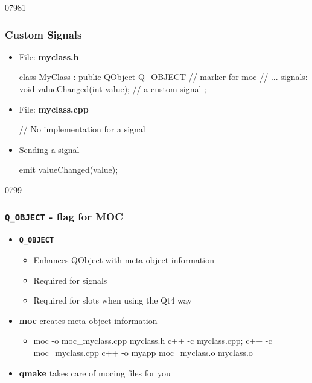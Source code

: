 
\begin{slide}[fragile]{07981}\frametitle{Custom Signals}
\label{codeForSignals1}
\begin{itemize}
\item File: \textbf{myclass.h} 
  \begin{cpp}
class MyClass : public QObject 
{
  Q_OBJECT // marker for moc                       
  // ...
signals:
  void valueChanged(int value); // a custom signal
};
  \end{cpp}
\item File: \textbf{myclass.cpp}
  \begin{cpp}
// No implementation for a signal

  \end{cpp}
\item Sending a signal
\begin{cpp}
emit valueChanged(value);
\end{cpp}
\end{itemize}


\end{slide}




\begin{slide}[fragile]{0799}\frametitle{\texttt{Q\_OBJECT} - flag for MOC}
\begin{itemize}
\item \textbf{\texttt{Q\_OBJECT}}
  \begin{itemize}
  \item Enhances QObject with meta-object information
  \item Required for signals
  \item Required for slots when using the Qt4 way
  \end{itemize}\medskip

  \item \textbf{moc} creates meta-object information
    \begin{itemize}
    \item[] \begin{shell}
moc -o moc_myclass.cpp myclass.h
c++ -c myclass.cpp; c++ -c moc_myclass.cpp
c++ -o myapp moc_myclass.o myclass.o
    \end{shell}
 \end{itemize}\medskip

 \item \textbf{qmake} takes care of mocing files for you
\end{itemize}

\end{slide}

